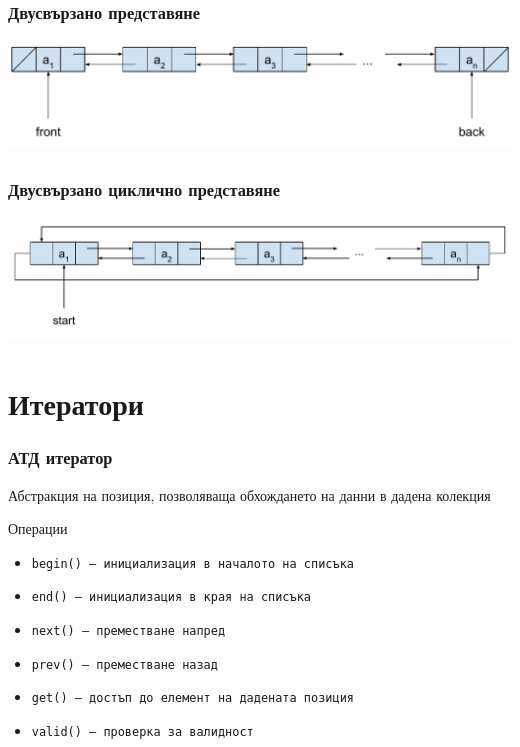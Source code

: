 \documentclass{beamer}
\begin{document}
\begin{frame}
  \frametitle{Двусвързано представяне}

  \begin{center}
    \includegraphics[width=\textwidth]{images/double_linked_list.pdf}
  \end{center}
\end{frame}

\begin{frame}
  \frametitle{Двусвързано циклично представяне}

  \begin{center}
    \includegraphics[width=\textwidth]{images/double_linked_cyclic_list.pdf}
  \end{center}
\end{frame}

\section{Итератори}

\begin{frame}
  \frametitle{АТД итератор}

  Абстракция на позиция, позволяваща обхождането на данни в дадена колекция
  \vspace{1em}

  Операции
  \vspace{0.5em}
  \begin{itemize}
  \item \tt{begin()} -- инициализация в началото на списъка
  \item \tt{end()} -- инициализация в края на списъка
  \item \tt{next()} -- преместване напред
  \item \tt{prev()} -- преместване назад
  \item \tt{get()} -- достъп до елемент на дадената позиция
  \item \tt{valid()} -- проверка за валидност
  \end{itemize}
\end{frame}
\end{document}

